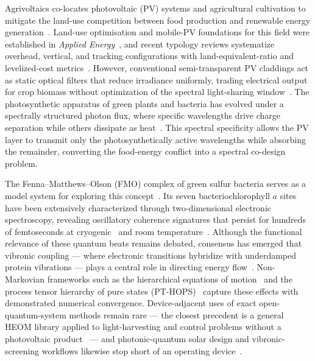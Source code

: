 \documentclass[preprint,12pt]{elsarticle}
\begin{document}


Agrivoltaics co-locates photovoltaic (PV) systems and agricultural cultivation to mitigate the land-use competition between food production and renewable energy generation~\cite{Goetzberger1981,Dupraz2011}. Land-use optimisation and mobile-PV foundations for this field were established in \textit{Applied Energy}~\cite{Valle2017,Amaducci2018}, and recent typology reviews systematize overhead, vertical, and tracking configurations with land-equivalent-ratio and levelized-cost metrics~\cite{Mahim2025}.
However, conventional semi-transparent PV claddings act as static optical filters that reduce irradiance uniformly, trading electrical output for crop biomass without optimization of the spectral light-sharing window~\cite{Thompson2020,Alshareef2024}.
The photosynthetic apparatus of green plants and bacteria has evolved under a spectrally structured photon flux, where specific wavelengths drive charge separation while others dissipate as heat~\cite{Blankenship2011}.
This spectral specificity allows the PV layer to transmit only the photosynthetically active wavelengths while absorbing the remainder, converting the food-energy conflict into a spectral co-design problem.

The Fenna--Matthews--Olson (FMO) complex of green sulfur bacteria serves as a model system for exploring this concept~\cite{Fenna1974}.
Its seven bacteriochlorophyll $a$ sites have been extensively characterized through two-dimensional electronic spectroscopy, revealing oscillatory coherence signatures that persist for hundreds of femtoseconds at cryogenic~\cite{Engel2007} and room temperature~\cite{Panitchayangkoon2010}.
Although the functional relevance of these quantum beats remains debated, consensus has emerged that vibronic coupling --- where electronic transitions hybridize with underdamped protein vibrations --- plays a central role in directing energy flow~\cite{Chin2013,Christensson2012}.
Non-Markovian frameworks such as the hierarchical equations of motion~\cite{Tanimura1989} and the process tensor hierarchy of pure states (PT-HOPS)~\cite{Varvelo2021,Citty2024} capture these effects with demonstrated numerical convergence. Device-adjacent uses of exact open-quantum-system methods remain rare --- the closest precedent is a general HEOM library applied to light-harvesting and control problems without a photovoltaic product~\cite{Lambert2023} --- and photonic-quantum solar design and vibronic-screening workflows likewise stop short of an operating device~\cite{LiuFang2026,Motlagh2024}.
\end{document}
